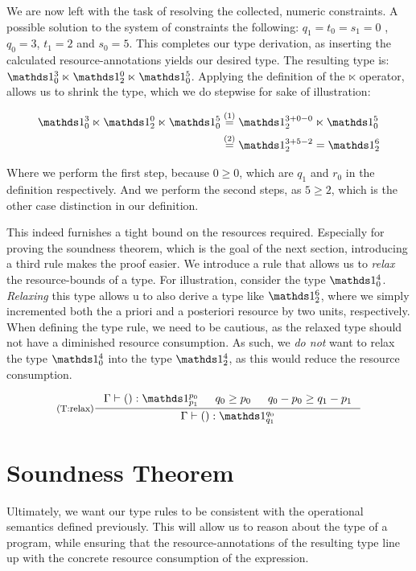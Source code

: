 We are now left with the task of resolving the collected, numeric constraints. A possible solution to the system of constraints the following: \(q_1 = t_0 = s_1 = 0\) , \(q_0 = 3\), \(t_1 = 2\) and \(s_0 = 5\). This completes our type derivation, as inserting the calculated resource-annotations yields our desired type. The resulting type is: \(\unit^{3}_{0} \ltimes \unit^{0}_{2} \ltimes \unit^{5}_{0}\).
Applying the definition of the \(\ltimes\) operator, allows us to shrink the type, which we do stepwise for sake of illustration:

\begin{align*}
   \unit^{3}_{0} \ltimes \unit^{0}_{2} \ltimes \unit^{5}_{0} &\stackrel{(1)}{=} \unit^{3 + 0 - 0}_2 \ltimes \unit^5_0\\
                                                             &\stackrel{(2)}{=} \unit^{3 + 5 - 2}_2 = \unit^6_2
\end{align*}

Where we perform the first step, because \( 0 \geq 0\), which are \(q_1\) and \(r_0\) in the definition respectively. And we perform the second steps, as \(5 \geq 2\), which is the other case distinction in our definition.

This indeed furnishes a tight bound on the resources required. Especially for proving the soundness theorem, which is the goal of the next section, introducing a third rule makes the proof easier. We introduce a rule that allows us to \emph{relax} the resource-bounds of a type. For illustration, consider the type \(\unit^4_0\). \emph{Relaxing} this type allows u to also derive a type like \(\unit^6_2\), where we simply incremented both the a priori and a posteriori resource by two units, respectively. When defining the type rule, we need to be cautious, as the relaxed type should not have a diminished resource consumption. As such, we \emph{do not} want to relax the type \(\unit^4_0\) into the type \(\unit^4_2\), as this would reduce the resource consumption.

\[
   \inference[(T:relax)]
   {\Gamma \vdash () : \unit^{p_0}_{p_1}
      & 
   q_0 \geq p_0
      &
   q_0 - p_0 \geq q_1 - p_1}
   {\Gamma \vdash () : \unit^{q_0}_{q_1}}
\]


\section{Soundness Theorem}
Ultimately, we want our type rules to be consistent with the operational semantics defined previously. This will allow us to reason about the type of a program, while ensuring that the resource-annotations of the resulting type line up with the concrete resource consumption of the expression.

